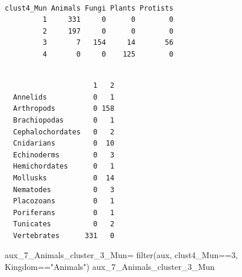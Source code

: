 \documentclass[
  letterpaper,
  DIV=11,
  numbers=noendperiod]{scrreprt}
\newenvironment{Shaded}{}{}
\newcommand{\DecValTok}[1]{\textcolor[rgb]{0.82,0.60,0.40}{#1}}
\newcommand{\FunctionTok}[1]{\textcolor[rgb]{0.38,0.69,0.94}{#1}}
\newcommand{\NormalTok}[1]{\textcolor[rgb]{0.67,0.70,0.75}{#1}}
\newcommand{\OtherTok}[1]{\textcolor[rgb]{0.15,0.68,0.38}{#1}}
\newcommand{\SpecialCharTok}[1]{\textcolor[rgb]{0.34,0.71,0.76}{#1}}
\newcommand{\StringTok}[1]{\textcolor[rgb]{0.60,0.76,0.47}{#1}}
\begin{document}
\begin{verbatim}
          
clust4_Mun Animals Fungi Plants Protists
         1     331     0      0        0
         2     197     0      0        0
         3       7   154     14       56
         4       0     0    125        0
\end{verbatim}

\begin{Shaded}
\end{Shaded}

\begin{verbatim}
                  
                     1   2
  Annelids           0   1
  Arthropods         0 158
  Brachiopodas       0   1
  Cephalochordates   0   2
  Cnidarians         0  10
  Echinoderms        0   3
  Hemichordates      0   1
  Mollusks           0  14
  Nematodes          0   3
  Placozoans         0   1
  Poriferans         0   1
  Tunicates          0   2
  Vertebrates      331   0
\end{verbatim}

\begin{Shaded}
\begin{Highlighting}[]
\NormalTok{aux\_7\_Animals\_cluster\_3\_Mun}\OtherTok{=} \FunctionTok{filter}\NormalTok{(aux,}
\NormalTok{                                clust4\_Mun}\SpecialCharTok{==}\DecValTok{3}\NormalTok{,}
\NormalTok{                                Kingdom}\SpecialCharTok{==}\StringTok{"Animals"}\NormalTok{)}
\NormalTok{aux\_7\_Animals\_cluster\_3\_Mun}
\end{Highlighting}
\end{Shaded}
\end{document}
